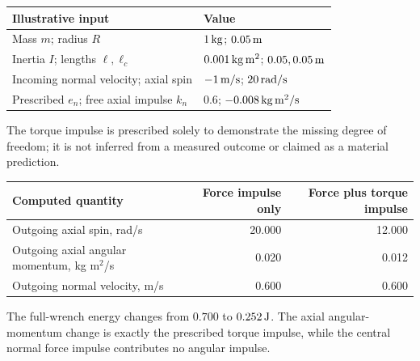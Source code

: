 \begin{center}\small\begin{tabular}{ll}\hline Illustrative input & Value\\\hline
Mass $m$; radius $R$ & $1\,{\rm kg}$; $0.05\,{\rm m}$\\
Inertia $I$; lengths $\ell,\ell_c$ & $0.001\,{\rm kg\,m^2}$; $0.05,0.05\,{\rm m}$\\
Incoming normal velocity; axial spin & $-1\,{\rm m/s}$; $20\,{\rm rad/s}$\\
Prescribed $e_n$; free axial impulse $k_n$ & $0.6$; $-0.008\,{\rm kg\,m^2/s}$\\\hline\end{tabular}\end{center}
The torque impulse is prescribed solely to demonstrate the missing degree of freedom; it is not inferred from a measured outcome or claimed as a material prediction.
\begin{center}\small\begin{tabular}{lrr}\hline Computed quantity & Force impulse only & Force plus torque impulse\\\hline
Outgoing axial spin, rad/s & 20.000 & 12.000\\
Outgoing axial angular momentum, kg m$^2$/s & 0.020 & 0.012\\
Outgoing normal velocity, m/s & 0.600 & 0.600\\
\hline\end{tabular}\end{center}
The full-wrench energy changes from $0.700$ to $0.252\,{\rm J}$. The axial angular-momentum change is exactly the prescribed torque impulse, while the central normal force impulse contributes no angular impulse.
